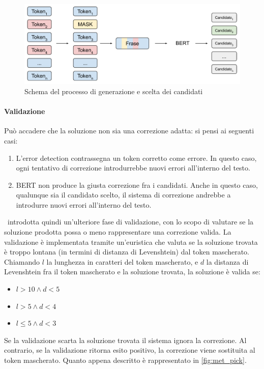 \begin{figure}[H]
\centering
\includegraphics[width=\textwidth]{immagini/metodologia/generazione_candidati}
\caption{Schema del processo di generazione e scelta dei candidati}
\label{fig:met_errgen}
\end{figure}

\paragraph{Validazione}
Può accadere che la soluzione non sia una correzione adatta: si pensi ai seguenti casi:
\begin{enumerate}
\item L'error detection contrassegna un token corretto come errore. In questo caso, ogni tentativo di correzione introdurrebbe nuovi errori all'interno del testo.
\item BERT non produce la giusta correzione fra i candidati. Anche in questo caso, qualunque sia il candidato scelto, il sistema di correzione andrebbe a introdurre nuovi errori all'interno del testo.
\end{enumerate}

\E\ introdotta quindi un'ulteriore fase di validazione, con lo scopo di valutare se la soluzione prodotta possa o meno rappresentare una correzione valida. La validazione è implementata tramite un'euristica che valuta se la soluzione trovata è troppo lontana (in termini di distanza di Levenshtein) dal token mascherato. Chiamando $l$ la lunghezza in caratteri del token mascherato, e $d$ la distanza di Levenshtein fra il token mascherato e la soluzione trovata, la soluzione è valida se:
\begin{itemize}
\item $l > 10 \wedge d < 5$ 
\item $l > 5 \wedge d < 4$ 
\item $l \leqslant 5 \wedge d < 3$ 
\end{itemize}
Se la validazione scarta la soluzione trovata il sistema ignora la correzione. Al contrario, se la validazione ritorna esito positivo, la correzione viene sostituita al token mascherato. Quanto appena descritto è rappresentato in \autoref{fig:met_pick}.

